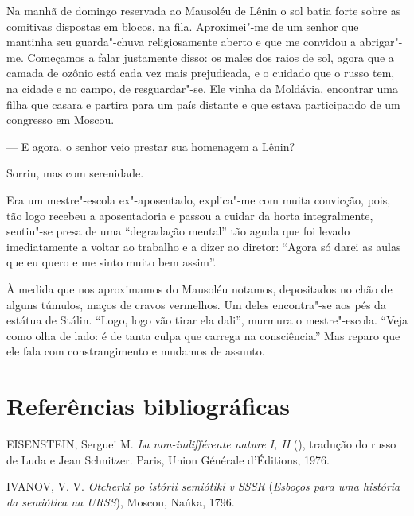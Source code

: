{{{Na manhã de domingo reservada ao Mausoléu de Lênin o sol batia forte sobre as comitivas dispostas em blocos, na fila. Aproximei"-me de um senhor que mantinha seu guarda"-chuva religiosamente aberto e que me convidou a abrigar"-me. Começamos a falar justamente disso: os males dos raios de sol, agora que a camada de ozônio está cada vez mais prejudicada, e o cuidado que o russo tem, na cidade e no campo, de resguardar"-se. Ele vinha da Moldávia, encontrar uma filha que casara e partira para um país distante e que estava participando de um congresso em Moscou.

--- E agora, o senhor veio prestar sua homenagem a Lênin?

Sorriu, mas com serenidade.

Era um mestre"-escola ex"-aposentado, explica"-me com muita convicção, pois, tão logo recebeu a aposentadoria e passou a cuidar da horta integralmente, sentiu"-se presa de uma ``degradação mental'' tão aguda que foi levado imediatamente a voltar ao trabalho e a dizer ao diretor: ``Agora só darei as aulas que eu quero e me sinto muito bem assim''.

À medida que nos aproximamos do Mausoléu notamos, depositados no chão de alguns túmulos, maços de cravos vermelhos. Um deles encontra"-se aos pés da estátua de Stálin. ``Logo, logo vão tirar ela dali'', murmura o mestre"-escola. ``Veja como olha de lado: é de tanta culpa que carrega na consciência.'' Mas reparo que ele fala com constrangimento e mudamos de assunto.

\section{Referências bibliográficas}

EISENSTEIN, Serguei M. \emph{La non-indifférente nature I, II} (),
tradução do russo de Luda e Jean Schnitzer. Paris, Union Générale
d'Éditions, 1976.


IVANOV, V. V. \emph{Otcherki po istórii semiótiki v SSSR} (\emph{Esboços
para uma história da semiótica na URSS}), Moscou, Naúka, 1796.

}}}
